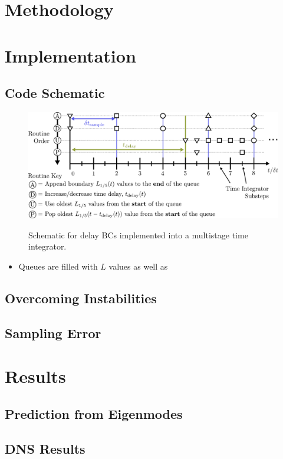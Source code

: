 \section{Methodology}

\section{Implementation}


\subsection{Code Schematic}

\begin{figure}[h]
\centering
\includegraphics[scale=0.6]{assets/imgs/delay_bc_code_schematic.pdf}
\label{fig:schematic}
\caption{Schematic for delay BCs implemented into a multistage time integrator. }
\end{figure}


\begin{itemize}
\item Queues are filled with $L$ values as well as 
\end{itemize}



\subsection{Overcoming Instabilities}



\subsection{Sampling Error}



\section{Results}

\subsection{Prediction from Eigenmodes}





\subsection{DNS Results}




